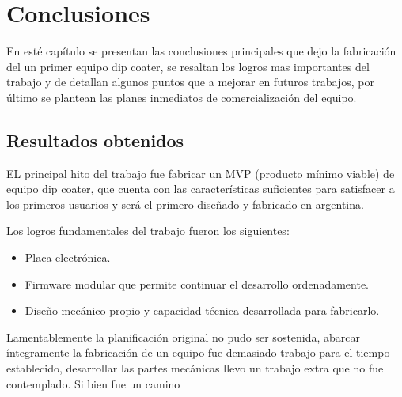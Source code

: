 
\chapter{Conclusiones} %

\label{Chapter5} %



En esté capítulo se presentan las conclusiones principales que dejo la fabricación del un primer equipo dip coater, se resaltan los logros mas importantes del trabajo y de detallan algunos puntos que a mejorar en futuros trabajos, por último se plantean las planes inmediatos de comercialización del equipo.

\section{Resultados obtenidos }


EL principal hito del trabajo fue fabricar un MVP (producto mínimo viable) de equipo dip coater, que cuenta con las características suficientes para satisfacer a los primeros usuarios y será el primero diseñado y fabricado en argentina. 

Los logros fundamentales del trabajo fueron los siguientes:

\begin{itemize}
\item Placa electrónica.
\item Firmware modular que permite continuar el desarrollo ordenadamente.
\item Diseño mecánico propio y capacidad técnica desarrollada para fabricarlo. 
\end{itemize} 
 
 
Lamentablemente la planificación original no pudo ser sostenida, abarcar íntegramente la fabricación de un equipo fue demasiado trabajo para el tiempo establecido, desarrollar las partes mecánicas llevo un trabajo extra que no fue contemplado. Si bien fue un camino  



 



